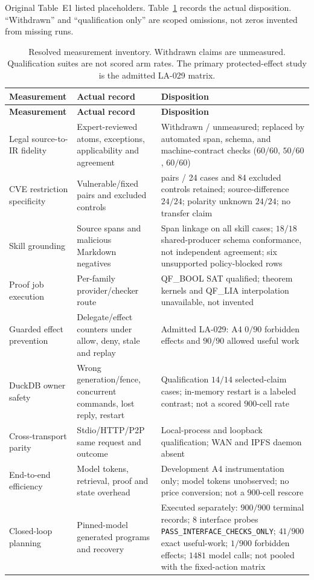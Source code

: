\documentclass{article}
\begin{document}
Original Table~E1 listed placeholders. Table~\ref{tab:E1} records the actual disposition. ``Withdrawn'' and ``qualification only'' are scoped omissions, not zeros invented from missing runs.
\begingroup
\renewcommand{\thetable}{E1}
\begin{longtable}{@{}>{\raggedright\arraybackslash}p{.24\linewidth} >{\raggedright\arraybackslash}p{.32\linewidth} >{\raggedright\arraybackslash}p{.38\linewidth}@{}}
\caption{Resolved measurement inventory. Withdrawn claims are unmeasured. Qualification suites are not scored arm rates. The primary protected-effect study is the admitted LA-029 matrix.}\label{tab:E1}\\
\toprule
\textbf{Measurement} & \textbf{Actual record} & \textbf{Disposition} \\
\midrule
\endfirsthead
\textbf{Measurement} & \textbf{Actual record} & \textbf{Disposition} \\
\midrule
\endhead
\bottomrule
\endlastfoot
Legal source-to-IR fidelity & Expert-reviewed atoms, exceptions, applicability and agreement & Withdrawn / unmeasured; replaced by automated span, schema, and machine-contract checks ($60/60$, $50/60$, $60/60$) \\[3pt]
CVE restriction specificity & Vulnerable/fixed pairs and excluded controls & 12 pairs / 24 cases and 84 excluded controls retained; source-difference $24/24$; polarity unknown $24/24$; no transfer claim \\[3pt]
Skill grounding & Source spans and malicious Markdown negatives & Span linkage on all skill cases; $18/18$ shared-producer schema conformance, not independent agreement; six unsupported policy-blocked rows \\[3pt]
Proof job execution & Per-family provider/checker route & QF\_BOOL SAT qualified; theorem kernels and QF\_LIA interpolation unavailable, not invented \\[3pt]
Guarded effect prevention & Delegate/effect counters under allow, deny, stale and replay & Admitted LA-029: A4 $0/90$ forbidden effects and $90/90$ allowed useful work \\[3pt]
DuckDB owner safety & Wrong generation/fence, concurrent commands, lost reply, restart & Qualification $14/14$ selected-claim cases; in-memory restart is a labeled contrast; not a scored $900$-cell rate \\[3pt]
Cross-transport parity & Stdio/HTTP/P2P same request and outcome & Local-process and loopback qualification; WAN and IPFS daemon absent \\[3pt]
End-to-end efficiency & Model tokens, retrieval, proof and state overhead & Development A4 instrumentation only; model tokens unobserved; no price conversion; not a $900$-cell rescore \\[3pt]
Closed-loop planning & Pinned-model generated programs and recovery & Executed separately: $900/900$ terminal records; 8 interface probes \texttt{PASS\_INTERFACE\_CHECKS\_ONLY}; $41/900$ exact useful-work; $1/900$ forbidden effects; $1481$ model calls; not pooled with the fixed-action matrix \\[3pt]
\end{longtable}
\endgroup
\end{document}
